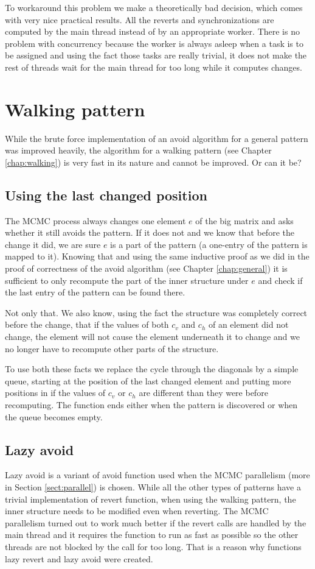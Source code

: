 To workaround this problem we make a theoretically bad decision, which comes with very nice practical results. All the reverts and synchronizations are computed by the main thread instead of by an appropriate worker. There is no problem with concurrency because the worker is always asleep when a task is to be assigned and using the fact those tasks are really trivial, it does not make the rest of threads wait for the main thread for too long while it computes changes.

\section{Walking pattern}
While the brute force implementation of an avoid algorithm for a general pattern was improved heavily, the algorithm for a walking pattern (see Chapter \ref{chap:walking}) is very fast in its nature and cannot be improved. Or can it be?

\subsection{Using the last changed position}
The MCMC process always changes one element $e$ of the big matrix and asks whether it still avoids the pattern. If it does not and we know that before the change it did, we are sure $e$ is a part of the pattern (a one-entry of the pattern is mapped to it). Knowing that and using the same inductive proof as we did in the proof of correctness of the avoid algorithm (see Chapter \ref{chap:general}) it is sufficient to only recompute the part of the inner structure under $e$ and check if the last entry of the pattern can be found there.

Not only that. We also know, using the fact the structure was completely correct before the change, that if the values of both $c_v$ and $c_h$ of an element did not change, the element will not cause the element underneath it to change and we no longer have to recompute other parts of the structure.

To use both these facts we replace the cycle through the diagonals by a simple queue, starting at the position of the last changed element and putting more positions in if the values of $c_v$ or $c_h$ are different than they were before recomputing. The function ends either when the pattern is discovered or when the queue becomes empty.

\subsection{Lazy avoid}
Lazy avoid is a variant of avoid function used when the MCMC parallelism (more in Section \ref{sect:parallel}) is chosen. While all the other types of patterns have a trivial implementation of revert function, when using the walking pattern, the inner structure needs to be modified even when reverting. The MCMC parallelism turned out to work much better if the revert calls are handled by the main thread and it requires the function to run as fast as possible so the other threads are not blocked by the call for too long. That is a reason why functions lazy revert and lazy avoid were created.

